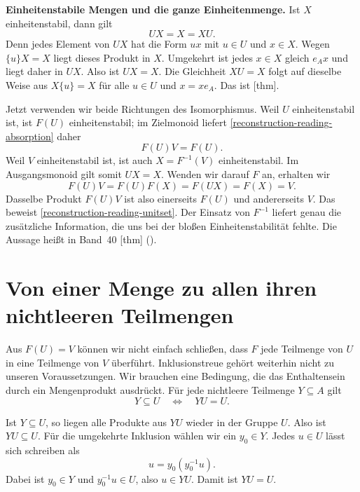 \medskip\noindent\textbf{Einheitenstabile Mengen und die ganze Einheitenmenge.}
Ist \(X\) einheitenstabil, dann gilt
\begin{equation}
  UX=X=XU.
  \tag{A}\label{reconstruction-reading-absorption}
\end{equation}
Denn jedes Element von \(UX\) hat die Form \(ux\) mit
\(u\in U\) und \(x\in X\). Wegen \(\{u\}X=X\) liegt
dieses Produkt in \(X\). Umgekehrt ist jedes \(x\in X\)
gleich \(e_Ax\) und liegt daher in \(UX\). Also ist
\(UX=X\). Die Gleichheit \(XU=X\) folgt auf dieselbe Weise
aus \(X\{u\}=X\) für alle \(u\in U\) und \(x=xe_A\).
Das ist [thm].

Jetzt verwenden wir beide Richtungen des Isomorphismus.
Weil \(U\) einheitenstabil ist, ist \(F(U)\) einheitenstabil; im Zielmonoid
liefert \eqref{reconstruction-reading-absorption} daher
\[
  F(U)V=F(U).
\]
Weil \(V\) einheitenstabil ist, ist auch \(X=F^{-1}(V)\) einheitenstabil.
Im Ausgangsmonoid gilt somit \(UX=X\). Wenden wir darauf
\(F\) an, erhalten wir
\[
  F(U)V=F(U)F(X)=F(UX)=F(X)=V.
\]
Dasselbe Produkt \(F(U)V\) ist also einerseits \(F(U)\) und
andererseits \(V\). Das beweist
\eqref{reconstruction-reading-unitset}. Der Einsatz von
\(F^{-1}\) liefert genau die zusätzliche Information, die
uns bei der bloßen Einheitenstabilität fehlte. Die Aussage heißt in
Band~40 [thm]
().

\par{}
\section*{Von einer Menge zu allen ihren nichtleeren Teilmengen}
\hypertarget{reconstruction.reading.subsets}{}

Aus \(F(U)=V\) können wir nicht einfach schließen, dass \(F\)
jede Teilmenge von \(U\) in eine Teilmenge von \(V\) überführt.
Inklusionstreue gehört weiterhin nicht zu unseren Voraussetzungen.
Wir brauchen eine Bedingung, die das Enthaltensein durch ein
Mengenprodukt ausdrückt. Für jede nichtleere Teilmenge
\(Y\subseteq A\) gilt
\begin{equation}
  Y\subseteq U\quad\Longleftrightarrow\quad YU=U.
  \tag{K}\label{reconstruction-reading-criterion}
\end{equation}

Ist \(Y\subseteq U\), so liegen alle Produkte aus \(YU\)
wieder in der Gruppe \(U\). Also ist \(YU\subseteq U\).
Für die umgekehrte Inklusion wählen wir ein \(y_0\in Y\).
Jedes \(u\in U\) lässt sich schreiben als
\[
  u=y_0(y_0^{-1}u).
\]
Dabei ist \(y_0\in Y\) und \(y_0^{-1}u\in U\), also
\(u\in YU\). Damit ist \(YU=U\).

